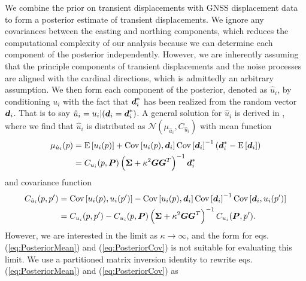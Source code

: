 \documentclass[extra,mreferee]{gji}
\begin{document}
We combine the prior on transient displacements with GNSS displacement data to form a posterior estimate of transient displacements. We ignore any covariances between the easting and northing components, which reduces the computational complexity of our analysis because we can determine each component of the posterior independently. However, we are inherently assuming that the principle components of transient displacements and the noise processes are aligned with the cardinal directions, which is admittedly an arbitrary assumption. We then form each component of the posterior, denoted as $\hat{u}_i$, by conditioning $u_i$ with the fact that $\mitbf{d}^*_i$ has been realized from the random vector $\mitbf{d}_i$. That is to say $\hat{u}_i = u_i |(\mitbf{d}_i = \mitbf{d}^*_i)$. A general solution for $\hat{u}_i$ is derived in \citet[sec. 8.9]{VonMises1964}, where we find that $\hat{u}_i$ is distributed as $\mathcal{N}(\mu_{\hat{u}_i},C_{\hat{u}_i})$ with mean function
\begin{align}\label{eq:PosteriorMean}
\mu_{\hat{u}_i}(p) &= \mathrm{E}\left[u_i(p)\right] + 
                      \mathrm{Cov}\left[u_i(p),\mitbf{d}_i\right] 
                      \mathrm{Cov}\left[\mitbf{d}_i\right]^{-1}
                      \left(\mitbf{d}^*_i - \mathrm{E}\left[\mitbf{d}_i\right]\right)\nonumber \\
                   &= C_{u_i}(p,\mitbf{P})\left(\mitbf{\Sigma} + \kappa^2\mitbf{G}\mitbf{G}^T\right)^{-1}\mitbf{d}^*_i
\end{align}    
and covariance function
\begin{align}\label{eq:PosteriorCov}
C_{\hat{u}_i}(p,p') &= \mathrm{Cov}\left[u_i(p),u_i(p')\right] - 
                       \mathrm{Cov}\left[u_i(p),\mitbf{d}_i\right] 
                       \mathrm{Cov}\left[\mitbf{d}_i\right]^{-1}
                       \mathrm{Cov}\left[\mitbf{d}_i,u_i(p')\right]\nonumber \\
                    &= C_{u_i}(p,p') - C_{u_i}(p,\mitbf{P})\left(\mitbf{\Sigma} + \kappa^2\mitbf{G}\mitbf{G}^T\right)^{-1}C_{u_i}(\mitbf{P},p').
\end{align}
However, we are interested in the limit as $\kappa \to \infty$, and the form for eqs. (\ref{eq:PosteriorMean}) and (\ref{eq:PosteriorCov}) is not suitable for evaluating this limit. We use a partitioned matrix inversion identity \citep[sec. 2.7.4]{Press2007} to rewrite eqs. (\ref{eq:PosteriorMean}) and (\ref{eq:PosteriorCov}) as
\end{document}
